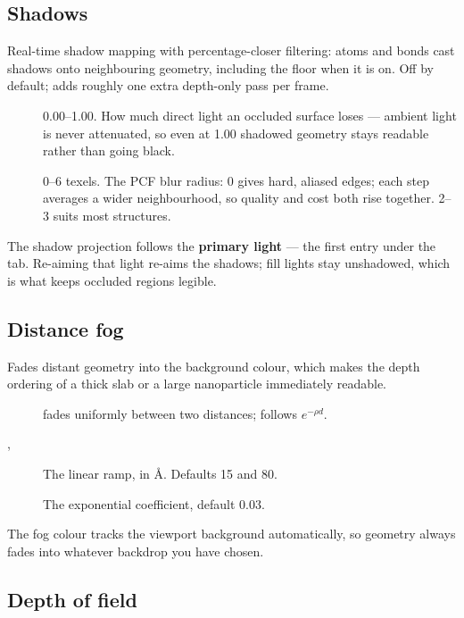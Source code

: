\subsection{Shadows}

Real-time shadow mapping with percentage-closer filtering: atoms and bonds
cast shadows onto neighbouring geometry, including the floor when it is on.
Off by default; adds roughly one extra depth-only pass per frame.

\begin{description}
  \item[] 0.00--1.00. How much direct light an occluded
    surface loses --- ambient light is never attenuated, so even at 1.00
    shadowed geometry stays readable rather than going black.
  \item[] 0--6 texels. The PCF blur radius: 0
    gives hard, aliased edges; each step averages a wider neighbourhood, so
    quality and cost both rise together. 2--3 suits most structures.
\end{description}

The shadow projection follows the \textbf{primary light} --- the first
entry under the  tab. Re-aiming that light re-aims the shadows;
fill lights stay unshadowed, which is what keeps occluded regions legible.

\subsection{Distance fog}

Fades distant geometry into the background colour, which makes the depth
ordering of a thick slab or a large nanoparticle immediately readable.

\begin{description}
  \item[]  fades uniformly
    between two distances;  follows
    $e^{-\rho d}$.
  \item[, ] The linear ramp, in \AA{}.
    Defaults 15 and 80.
  \item[] The exponential coefficient, default 0.03.
\end{description}

The fog colour tracks the viewport background automatically, so geometry
always fades into whatever backdrop you have chosen.

\subsection{Depth of field}

